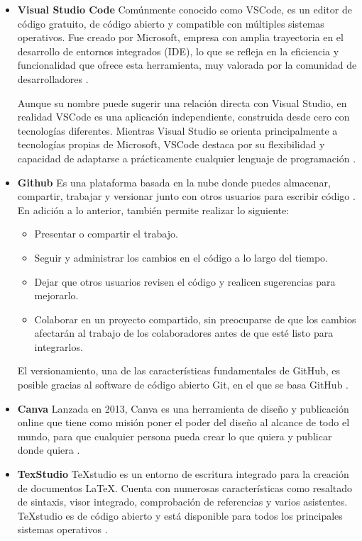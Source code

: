 \begin{itemize}	
	
	\item\textbf{Visual Studio Code} Comúnmente conocido como VSCode, es un editor de código gratuito, de código abierto y compatible con múltiples sistemas operativos. Fue creado por Microsoft, empresa con amplia trayectoria en el desarrollo de entornos integrados (IDE), lo que se refleja en la eficiencia y funcionalidad que ofrece esta herramienta, muy valorada por la comunidad de desarrolladores \cite{cimas2024vscode}.

	Aunque su nombre puede sugerir una relación directa con Visual Studio, en realidad VSCode es una aplicación independiente, construida desde cero con tecnologías diferentes. Mientras Visual Studio se orienta principalmente a tecnologías propias de Microsoft, VSCode destaca por su flexibilidad y capacidad de adaptarse a prácticamente cualquier lenguaje de programación \cite{garcia2024vscode}.

	\item\textbf{Github} Es una plataforma basada en la nube donde puedes almacenar, compartir, trabajar y versionar junto con otros usuarios para escribir código \cite{github2025about}. En adición a lo anterior, también permite realizar lo siguiente:
	
	\begin{itemize}
		
		\item Presentar o compartir el trabajo.
		
		\item Seguir y administrar los cambios en el código a lo largo del tiempo.
		
		\item Dejar que otros usuarios revisen el código y realicen sugerencias para mejorarlo.
		
		\item Colaborar en un proyecto compartido, sin preocuparse de que los cambios afectarán al trabajo de los colaboradores antes de que esté listo para integrarlos.
		
	\end{itemize}
	
	El versionamiento, una de las características fundamentales de GitHub, es posible gracias al software de código abierto Git, en el que se basa GitHub \cite{github2025about}.
	
	\item\textbf{Canva}	Lanzada en 2013, Canva es una herramienta de diseño y publicación online que tiene como misión poner el poder del diseño al alcance de todo el mundo, para que cualquier persona pueda crear lo que quiera y publicar donde quiera \cite{canva2025about}.
	
	\item\textbf{TexStudio}	TeXstudio es un entorno de escritura integrado para la creación de documentos LaTeX. Cuenta con numerosas características como resaltado de sintaxis, visor integrado, comprobación de referencias y varios asistentes. TeXstudio es de código abierto y está disponible para todos los principales sistemas operativos \cite{texstudio}.
	
\end{itemize}
